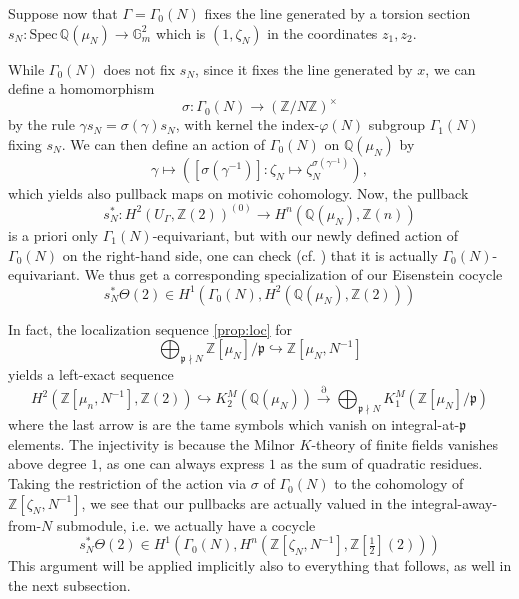 \documentclass[10pt]{amsart}
\theoremstyle{definition}
\newcommand{\Z}{\mathbb{Z}}
\newcommand{\Q}{\mathbb{Q}}
\numberwithin{equation}{section}
\begin{document}
    Suppose now that $\Gamma=\Gamma_0(N)$ fixes the line generated by a torsion section $s_N:\mathrm{Spec }\, \Q(\mu_N)\to \mathbb{G}_m^2$ which is $(1,\zeta_N)$ in the coordinates $z_1,z_2$. 
    
    While $\Gamma_0(N)$ does not fix $s_N$, since it fixes the line generated by $x$, we can define a homomorphism
    \[
        \sigma: \Gamma_0(N) \to (\Z/N\Z)^\times
    \]
    by the rule $\gamma s_N = \sigma(\gamma) s_N$, with kernel the index-$\varphi(N)$ subgroup $\Gamma_1(N)$ fixing $s_N$. We can then define an action of $\Gamma_0(N)$ on $\Q(\mu_N)$ by 
    \[
        \gamma \mapsto ([\sigma(\gamma^{-1})]:\zeta_N \mapsto \zeta_N^{\sigma(\gamma^{-1})}),
    \]
    which yields also pullback maps on motivic cohomology. Now, the pullback 
    \[
    s_N^*:H^2(U_\Gamma, \Z(2))^{(0)} \to H^n(\Q(\mu_N), \mathbb{Z}(n))
    \]
    is a priori only $\Gamma_1(N)$-equivariant, but with our newly defined action of $\Gamma_0(N)$ on the right-hand side, one can check (cf. \cite[\S4]{SV}) that it is actually $\Gamma_0(N)$-equivariant. We thus get a corresponding specialization of our Eisenstein cocycle
    \[
    s_N^* \Theta(2) \in H^{1}(\Gamma_0(N), H^2(\Q(\mu_N), \mathbb{Z}(2)))
    \]
    
    In fact, the localization sequence \eqref{prop:loc} for 
    \[
    \bigoplus_{\mathfrak{p} \nmid N} \Z[\mu_N]/\mathfrak{p} \hookrightarrow \Z[\mu_N, N^{-1}]
    \]
    yields a left-exact sequence
    \[
    H^2(\Z[\mu_n, N^{-1}], \Z(2)) \hookrightarrow K^M_2(\Q(\mu_N))\xrightarrow{\partial} \bigoplus_{\mathfrak{p} \nmid N} K^M_1(\Z[\mu_N]/\mathfrak{p})
    \]
    where the last arrow is are the tame symbols which vanish on integral-at-$\mathfrak{p}$ elements. The injectivity is because the Milnor $K$-theory of finite fields vanishes above degree $1$, as one can always express $1$ as the sum of quadratic residues. Taking the restriction of the action via $\sigma$ of $\Gamma_0(N)$ to the cohomology of $\Z[\zeta_N,N^{-1}]$, we see that our pullbacks are actually valued in the integral-away-from-$N$ submodule, i.e. we actually have a cocycle
    \[
    s_N^*\Theta(2) \in H^{1}(\Gamma_0(N),H^n(\Z[\zeta_N,N^{-1}], \Z[\tfrac{1}{2}](2)))
    \]
    This argument will be applied implicitly also to everything that follows, as well in the next subsection.
    
\end{document}
